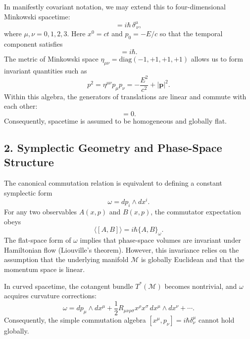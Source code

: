 \documentclass[11pt,oneside]{book}
\numberwithin{equation}{chapter}
\begin{document}
In manifestly covariant notation, we may extend this to four-dimensional Minkowski spacetime:
\begin{equation}
[x^\mu,\,p_\nu] = i\hbar\,\delta^\mu_{\ \nu},
\end{equation}
where $\mu,\nu=0,1,2,3$.  
Here $x^0 = ct$ and $p_0 = -E/c$ so that the temporal component satisfies
\begin{equation}
[x^0,\,p_0] = i\hbar.
\end{equation}
The metric of Minkowski space $\eta_{\mu\nu}=\mathrm{diag}(-1,+1,+1,+1)$ allows us to form invariant quantities such as
\begin{equation}
p^2 = \eta^{\mu\nu}p_\mu p_\nu = -\frac{E^2}{c^2}+|\mathbf{p}|^2.
\end{equation}
Within this algebra, the generators of translations are linear and commute with each other:
\begin{equation}
[P_\mu,\,P_\nu]=0.
\end{equation}
Consequently, spacetime is assumed to be homogeneous and globally flat.

\subsection*{2. Symplectic Geometry and Phase-Space Structure}

The canonical commutation relation is equivalent to defining a constant symplectic form
\begin{equation}
\omega = dp_i \wedge dx^i.
\end{equation}
For any two observables $A(x,p)$ and $B(x,p)$, the commutator expectation obeys
\begin{equation}
\langle [A,B]\rangle = i\hbar \{A,B\}_{\omega}.
\end{equation}
The flat-space form of $\omega$ implies that phase-space volumes are invariant under Hamiltonian flow (Liouville’s theorem).  
However, this invariance relies on the assumption that the underlying manifold $\mathcal{M}$ is globally Euclidean and that the momentum space is linear.

In curved spacetime, the cotangent bundle $T^*(\mathcal{M})$ becomes nontrivial, and $\omega$ acquires curvature corrections:
\begin{equation}
\omega = dp_\mu \wedge dx^\mu
+ \frac{1}{2}R_{\mu\nu\rho\sigma}x^\rho x^\sigma\,dx^\mu \wedge dx^\nu + \cdots.
\end{equation}
Consequently, the simple commutation algebra $[x^\mu,p_\nu]=i\hbar\delta^\mu_\nu$ cannot hold globally.
\end{document}
